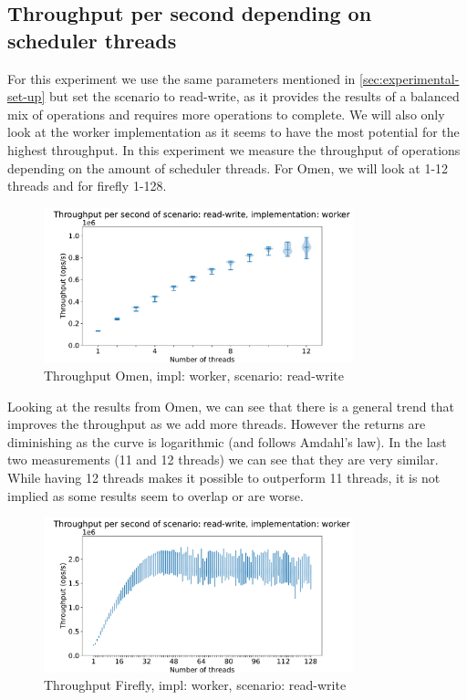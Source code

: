 \documentclass{article}
\begin{document}
\subsection{Throughput per second depending on scheduler threads}
\label{sec:throughput-per-second-depending-on-scheduler-threads}
For this experiment we use the same parameters mentioned in
\autoref{sec:experimental-set-up} but set the scenario to read-write, as it
provides the results of a balanced mix of operations and requires more
operations to complete. We will also only look at the worker implementation as
it seems to have the most potential for the highest throughput. In this experiment we measure the throughput of
operations depending on the amount of scheduler threads. For Omen, we will look
at 1-12 threads and for firefly 1-128.
\begin{figure}[H]
	\centering
	\includegraphics[width=0.8\textwidth]{violinplots/omen/throughput-per-second-of-scenario-read-write-implementation-worker-violinplot.pdf}
	\caption{Throughput Omen, impl: worker, scenario: read-write}
	\label{fig:throughput-omen-read-write-depend-threads}
\end{figure}
Looking at the results from Omen, we can see that there is a general trend that
improves the throughput as we add more threads. However the returns are
diminishing as the curve is logarithmic (and follows Amdahl's law). In the last two measurements (11 and 12
threads) we can see that they are very similar. While having 12 threads makes it
possible to outperform 11 threads, it is not implied as some results seem to
overlap or are worse.
\begin{figure}[H]
	\centering
	\includegraphics[width=0.8\textwidth]{violinplots/firefly/throughput-per-second-of-scenario-read-write-implementation-worker-violinplot.pdf}
	\caption{Throughput Firefly, impl: worker, scenario: read-write}
	\label{fig:throughput-firefly-read-write-depend-threads}

\end{figure}
\end{document}
